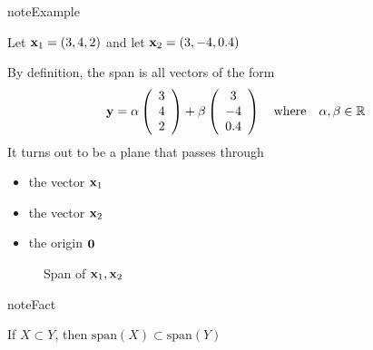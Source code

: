 \documentclass[letterpaper,10pt,english]{jupyterBook}
\begin{document}
\begin{sphinxadmonition}{note}{Example}

\sphinxAtStartPar
Let \({\bf x}_1 = (3, 4, 2)\) and let \({\bf x}_2 = (3, -4, 0.4)\)

\sphinxAtStartPar
By definition, the span is all vectors of the form
\begin{equation*}
\begin{split}
%
{\bf y} = 
\alpha \left(
\begin{array}{c}
3 \\
4 \\
2
\end{array}
\right)
+
\beta \left(
\begin{array}{c}
3 \\
-4 \\
0.4
\end{array}
\right)
\quad \text{where} \quad
\alpha, \beta \in \mathbb{R}
%
\end{split}
\end{equation*}
\sphinxAtStartPar
It turns out to be a plane that passes through
\begin{itemize}
\item {} 
\sphinxAtStartPar
the vector \({\bf x}_1\)

\item {} 
\sphinxAtStartPar
the vector \({\bf x}_2\)

\item {} 
\sphinxAtStartPar
the origin \({\bf 0}\)

\end{itemize}
\end{sphinxadmonition}

\begin{figure}[htbp]
\centering
\capstart

\noindent{}
\caption{Span of \({\bf x}_1, {\bf x}_2\)}\label{\detokenize{05.linear_algebra:f-span-plane}}\end{figure}

\begin{sphinxadmonition}{note}{Fact}

\sphinxAtStartPar
If \(X \subset Y\), then \(\mathrm{span}(X) \subset \mathrm{span}(Y)\)
\end{sphinxadmonition}
\end{document}
